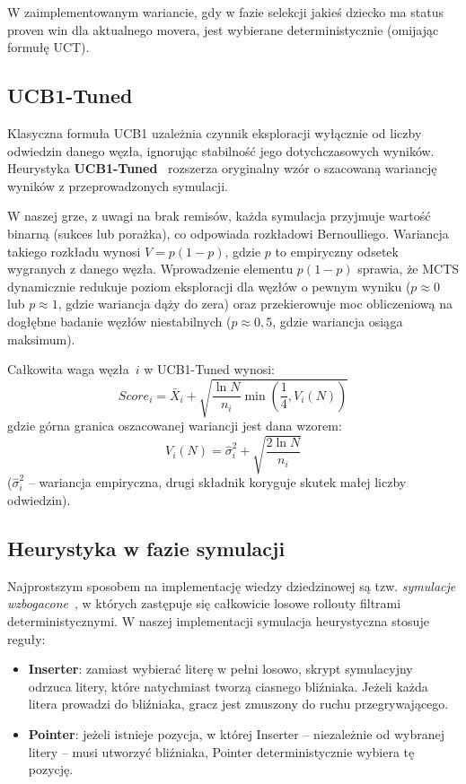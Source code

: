 \documentclass{article}
\begin{document}
W zaimplementowanym wariancie, gdy w fazie selekcji jakieś dziecko ma
status proven win dla aktualnego movera, jest wybierane deterministycznie
(omijając formułę UCT).

\subsection{UCB1-Tuned}
Klasyczna formuła UCB1 uzależnia czynnik eksploracji wyłącznie od liczby
odwiedzin danego węzła, ignorując stabilność jego dotychczasowych wyników.
Heurystyka \textbf{UCB1-Tuned}~\cite{Auer2002} rozszerza oryginalny wzór
o szacowaną wariancję wyników z przeprowadzonych symulacji.

W naszej grze, z uwagi na brak remisów, każda symulacja przyjmuje wartość
binarną (sukces lub porażka), co odpowiada rozkładowi Bernoulliego.
Wariancja takiego rozkładu wynosi $V=p(1-p)$, gdzie $p$ to empiryczny
odsetek wygranych z danego węzła. Wprowadzenie elementu $p(1-p)$ sprawia,
że MCTS dynamicznie redukuje poziom eksploracji dla węzłów o pewnym
wyniku ($p\approx 0$ lub $p\approx 1$, gdzie wariancja dąży do zera) oraz
przekierowuje moc obliczeniową na dogłębne badanie węzłów niestabilnych
($p\approx 0{,}5$, gdzie wariancja osiąga maksimum).

Całkowita waga węzła~$i$ w UCB1-Tuned wynosi:
\begin{equation}
    Score_i = \bar{X}_i + \sqrt{\frac{\ln N}{n_i} \min\left(\frac{1}{4}, V_i(N)\right)}
\end{equation}
gdzie górna granica oszacowanej wariancji jest dana wzorem:
\begin{equation}
    V_i(N) = \hat{\sigma}_i^2 + \sqrt{\frac{2 \ln N}{n_i}}
\end{equation}
($\hat{\sigma}_i^2$ -- wariancja empiryczna, drugi składnik koryguje
skutek małej liczby odwiedzin).

\subsection{Heurystyka w fazie symulacji}
Najprostszym sposobem na implementację wiedzy dziedzinowej są tzw.
\emph{symulacje wzbogacone}~\cite{Chaslot2008}, w których zastępuje się
całkowicie losowe rollouty filtrami deterministycznymi. W naszej
implementacji symulacja heurystyczna stosuje reguły:
\begin{itemize}
    \item \textbf{Inserter}: zamiast wybierać literę w pełni losowo,
    skrypt symulacyjny odrzuca litery, które natychmiast tworzą ciasnego
    bliźniaka. Jeżeli każda litera prowadzi do bliźniaka, gracz jest
    zmuszony do ruchu przegrywającego.
    \item \textbf{Pointer}: jeżeli istnieje pozycja, w której Inserter --
    niezależnie od wybranej litery -- musi utworzyć bliźniaka, Pointer
    deterministycznie wybiera tę pozycję.
\end{itemize}
\end{document}
